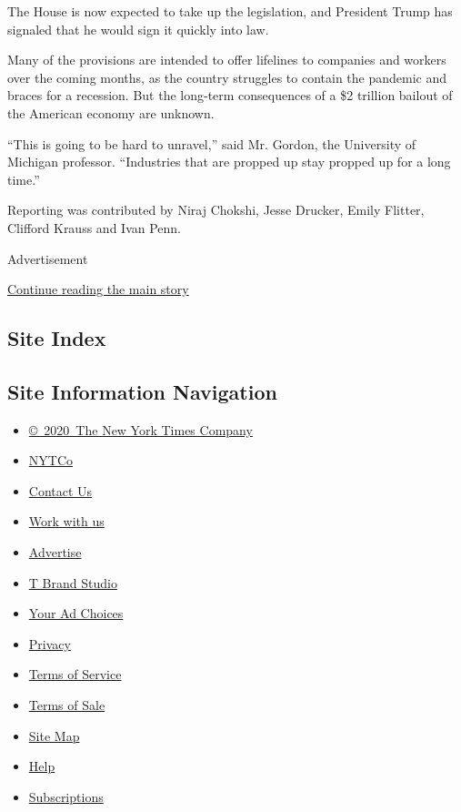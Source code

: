 The House is now expected to take up the legislation, and President
Trump has signaled that he would sign it quickly into law.

Many of the provisions are intended to offer lifelines to companies and
workers over the coming months, as the country struggles to contain the
pandemic and braces for a recession. But the long-term consequences of a
\$2 trillion bailout of the American economy are unknown.

``This is going to be hard to unravel,'' said Mr. Gordon, the University
of Michigan professor. ``Industries that are propped up stay propped up
for a long time.''

Reporting was contributed by Niraj Chokshi, Jesse Drucker, Emily
Flitter, Clifford Krauss and Ivan Penn.

Advertisement

\protect\hyperlink{after-bottom}{Continue reading the main story}

\hypertarget{site-index}{%
\subsection{Site Index}\label{site-index}}

\hypertarget{site-information-navigation}{%
\subsection{Site Information
Navigation}\label{site-information-navigation}}

\begin{itemize}
\tightlist
\item
  \href{https://help.nytimes.com/hc/en-us/articles/115014792127-Copyright-notice}{©~2020~The
  New York Times Company}
\end{itemize}

\begin{itemize}
\tightlist
\item
  \href{https://www.nytco.com/}{NYTCo}
\item
  \href{https://help.nytimes.com/hc/en-us/articles/115015385887-Contact-Us}{Contact
  Us}
\item
  \href{https://www.nytco.com/careers/}{Work with us}
\item
  \href{https://nytmediakit.com/}{Advertise}
\item
  \href{http://www.tbrandstudio.com/}{T Brand Studio}
\item
  \href{https://www.nytimes.com/privacy/cookie-policy\#how-do-i-manage-trackers}{Your
  Ad Choices}
\item
  \href{https://www.nytimes.com/privacy}{Privacy}
\item
  \href{https://help.nytimes.com/hc/en-us/articles/115014893428-Terms-of-service}{Terms
  of Service}
\item
  \href{https://help.nytimes.com/hc/en-us/articles/115014893968-Terms-of-sale}{Terms
  of Sale}
\item
  \href{https://spiderbites.nytimes.com}{Site Map}
\item
  \href{https://help.nytimes.com/hc/en-us}{Help}
\item
  \href{https://www.nytimes.com/subscription?campaignId=37WXW}{Subscriptions}
\end{itemize}
